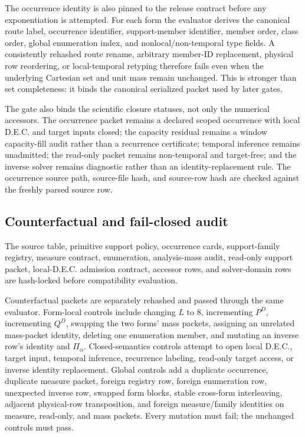 The occurrence identity is also pinned to the release contract before any
exponentiation is attempted.  For each form the evaluator derives the
canonical route label, occurrence identifier, support-member identifier,
member order, class order, global enumeration index, and nonlocal/non-temporal
type fields.  A consistently rehashed route rename, arbitrary member-ID
replacement, physical row reordering, or local-temporal retyping therefore
fails even when the underlying Cartesian set and unit mass remain unchanged.
This is stronger than set completeness: it binds the canonical serialized
packet used by later gates.

The gate also binds the scientific closure statuses, not only the numerical
accessors.  The occurrence packet remains a declared scoped occurrence with
local D.E.C. and target inputs closed; the capacity residual remains a window
capacity-fill audit rather than a recurrence certificate; temporal inference
remains unadmitted; the read-only packet remains non-temporal and target-free;
and the inverse solver remains diagnostic rather than an identity-replacement
rule.  The occurrence source path, source-file hash, and source-row hash are
checked against the freshly parsed source row.

\subsection{Counterfactual and fail-closed audit}

The source table, primitive support policy, occurrence cards, support-family
registry, measure contract, enumeration, analysis-mass audit, read-only support
packet, local-D.E.C. admission contract, accessor rows, and solver-domain rows
are hash-locked before compatibility evaluation.

Counterfactual packets are separately rehashed and passed through the same
evaluator.  Form-local controls include changing \(L\) to \(8\), incrementing
\(P^D\), incrementing \(Q^D\), swapping the two forms' mass packets, assigning
an unrelated mass-packet identity, deleting one enumeration member, and
mutating an inverse row's identity and \(\Pi_\alpha\).  Closed-semantics
controls attempt to open local D.E.C., target input, temporal inference,
recurrence labeling, read-only target access, or inverse identity replacement.
Global controls add a duplicate occurrence, duplicate measure packet, foreign
registry row, foreign enumeration row, unexpected inverse row, swapped form
blocks, stable cross-form interleaving, adjacent physical-row transposition,
and foreign measure/family identities on measure, read-only, and mass packets.
Every mutation must fail; the unchanged controls must pass.

